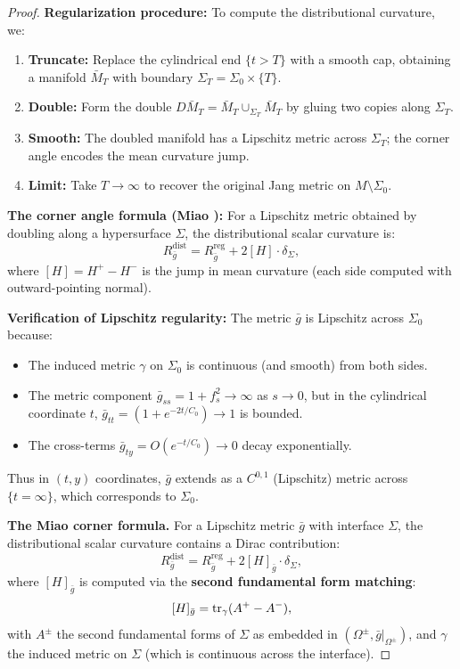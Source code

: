 \begin{proof}
\textbf{Regularization procedure:} To compute the distributional curvature, we:
\begin{enumerate}
    \item \textbf{Truncate:} Replace the cylindrical end $\{t > T\}$ with a smooth cap, obtaining a manifold $\bar{M}_T$ with boundary $\Sigma_T = \Sigma_0 \times \{T\}$.
    \item \textbf{Double:} Form the double $D\bar{M}_T = \bar{M}_T \cup_{\Sigma_T} \bar{M}_T$ by gluing two copies along $\Sigma_T$.
    \item \textbf{Smooth:} The doubled manifold has a Lipschitz metric across $\Sigma_T$; the corner angle encodes the mean curvature jump.
    \item \textbf{Limit:} Take $T \to \infty$ to recover the original Jang metric on $M \setminus \Sigma_0$.
\end{enumerate}

\textbf{The corner angle formula (Miao \cite{miao2002}):} For a Lipschitz metric obtained by doubling along a hypersurface $\Sigma$, the distributional scalar curvature is:
\begin{equation}\label{eq:MiaoDistributional}
    R^{\mathrm{dist}}_{\bar{g}} = R^{\mathrm{reg}}_{\bar{g}} + 2[H] \cdot \delta_\Sigma,
\end{equation}
where $[H] = H^+ - H^-$ is the jump in mean curvature (each side computed with outward-pointing normal).

\textbf{Verification of Lipschitz regularity:} The metric $\bar{g}$ is Lipschitz across $\Sigma_0$ because:
\begin{itemize}
    \item The induced metric $\gamma$ on $\Sigma_0$ is continuous (and smooth) from both sides.
    \item The metric component $\bar{g}_{ss} = 1 + f_s^2 \to \infty$ as $s \to 0$, but in the cylindrical coordinate $t$, $\bar{g}_{tt} = (1 + e^{-2t/C_0}) \to 1$ is bounded.
    \item The cross-terms $\bar{g}_{ty} = O(e^{-t/C_0}) \to 0$ decay exponentially.
\end{itemize}
Thus in $(t, y)$ coordinates, $\bar{g}$ extends as a $C^{0,1}$ (Lipschitz) metric across $\{t = \infty\}$, which corresponds to $\Sigma_0$.

\textbf{The Miao corner formula.} For a Lipschitz metric $\bar{g}$ with interface $\Sigma$, the distributional scalar curvature contains a Dirac contribution:
\begin{equation}\label{eq:MiaoCornerFormula}
    R_{\bar{g}}^{\mathrm{dist}} = R_{\bar{g}}^{\mathrm{reg}} + 2[H]_{\bar{g}} \cdot \delta_\Sigma,
\end{equation}
where $[H]_{\bar{g}}$ is computed via the \textbf{second fundamental form matching}:
\begin{equation}\label{eq:JumpFromSFF}
    [H]_{\bar{g}} = \mathrm{tr}_{\gamma}(A^+ - A^-),
\end{equation}
with $A^\pm$ the second fundamental forms of $\Sigma$ as embedded in $(\Omega^\pm, \bar{g}|_{\Omega^\pm})$, and $\gamma$ the induced metric on $\Sigma$ (which is continuous across the interface).


\end{proof}
